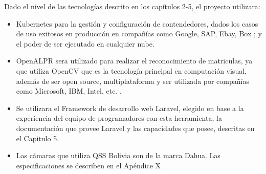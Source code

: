         Dado el nivel de las tecnologías descrito en los capítulos 2-5, el proyecto utilizara:
        \begin{itemize}
            \item Kubernetes para la gestión y configuración de contendedores, dados los casos de uso exitosos en producción en compañías como Google, SAP, Ebay, Box \parencite{Kubernetes2016-ub}; y el poder de ser ejecutado en cualquier nube.
            \item OpenALPR sera utilizado para realizar el reconocimiento de matriculas, ya que utiliza OpenCV que es la tecnología principal en computación visual, además de ser open source, multiplataforma y ser utilizada por compañías como Microsoft, IBM, Intel, etc. \parencite{Itseez2000-he}.
            \item Se utilizara el Framework de desarrollo web Laravel, elegido en base a la experiencia del equipo de programadores con esta herramienta, la documentación que provee Laravel y las capacidades que posee, descritas en el Capitulo 5.
            \item Las cámaras que utiliza QSS Bolivia son de la marca Dahua. Las especificaciones se describen en el  Apéndice X
        \end{itemize}

